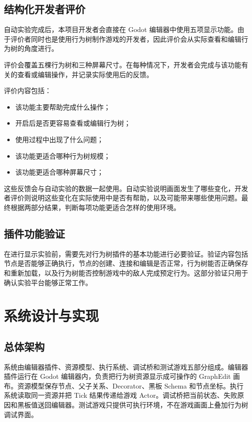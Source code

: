 \documentclass[11pt,a4paper,oneside,extrafontsizes]{memoir}
\begin{document}
\section{结构化开发者评价}

自动实验完成后，本项目开发者会直接在 Godot 编辑器中使用五项显示功能。由于评价者同时也是使用行为树制作游戏的开发者，因此评价会从实际查看和编辑行为树的角度进行。

评价会覆盖五棵行为树和三种屏幕尺寸。在每种情况下，开发者会完成与该功能有关的查看或编辑操作，并记录实际使用后的反馈。

评价内容包括：

\begin{itemize}[leftmargin=*]
\item 该功能主要帮助完成什么操作；
\item 开启后是否更容易查看或编辑行为树；
\item 使用过程中出现了什么问题；
\item 该功能更适合哪种行为树规模；
\item 该功能更适合哪种屏幕尺寸；
\end{itemize}

这些反馈会与自动实验的数据一起使用。自动实验说明画面发生了哪些变化，开发者评价则说明这些变化在实际使用中是否有帮助，以及可能带来哪些使用问题。最终根据两部分结果，判断每项功能更适合怎样的使用环境。

\section{插件功能验证}

在进行显示实验前，需要先对行为树插件的基本功能进行必要验证。验证内容包括节点是否能够正确执行，节点的创建、连接和编辑是否正常，行为树能否正确保存和重新加载，以及行为树能否控制游戏中的敌人完成预定行为。这部分验证只用于确认实验平台能够正常工作。

\chapter{系统设计与实现}

\section{总体架构}

系统由编辑器插件、资源模型、执行系统、调试桥和测试游戏五部分组成。编辑器插件运行在 Godot 编辑器内，负责把行为树资源显示成可操作的 GraphEdit 画布。资源模型保存节点、父子关系、Decorator、黑板 Schema 和节点坐标。执行系统读取同一资源并把 Tick 结果传递给游戏 Actor。调试桥把当前状态、失败原因和黑板值送回编辑器。测试游戏只提供可执行环境，不在游戏画面上叠加行为树调试界面。
\end{document}
